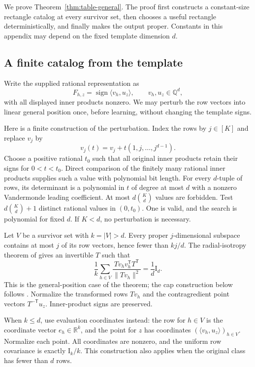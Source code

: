 \documentclass[11pt,letterpaper,pmlr,twoside]{jmlr}
\newcommand{\R}{\mathbb R}
\newcommand{\Q}{\mathbb Q}
\newcommand{\sgn}{\operatorname{sign}}
\newcommand{\ip}[2]{\langle #1,#2\rangle}
\newcommand{\norm}[1]{\lVert #1\rVert}
\newcommand{\Id}{\mathrm I}
\begin{document}
We prove Theorem~\ref{thm:table-general}. The proof first constructs a constant-size rectangle catalog at every survivor set, then chooses a useful rectangle deterministically, and finally makes the output proper. Constants in this appendix may depend on the fixed template dimension $d$.

\subsection{A finite catalog from the template}
Write the supplied rational representation as
\[
 F_{h,z}=\sgn\ip{v_h}{u_z},\qquad v_h,u_z\in\Q^d,
\]
with all displayed inner products nonzero. We may perturb the row vectors into linear general position once, before learning, without changing the template signs.

Here is a finite construction of the perturbation. Index the rows by $j\in[K]$ and replace $v_j$ by
\[
 v_j(t)=v_j+t(1,j,\ldots,j^{d-1}).
\]
Choose a positive rational $t_0$ such that all original inner products retain their signs for $0<t<t_0$. Direct comparison of the finitely many rational inner products supplies such a value with polynomial bit length. For every $d$-tuple of rows, its determinant is a polynomial in $t$ of degree at most $d$ with a nonzero Vandermonde leading coefficient. At most $d\binom Kd$ values are forbidden. Test $d\binom Kd+1$ distinct rational values in $(0,t_0)$. One is valid, and the search is polynomial for fixed $d$. If $K<d$, no perturbation is necessary.

Let $V$ be a survivor set with $k=|V|>d$. Every proper $j$-dimensional subspace contains at most $j$ of its row vectors, hence fewer than $kj/d$. The radial-isotropy theorem of \citet{Forster02} gives an invertible $T$ such that
\begin{equation}
 \frac1k\sum_{h\in V}\frac{Tv_hv_h^{\mathsf T}T^{\mathsf T}}{\norm{Tv_h}^2}
 =\frac1d\Id_d.
\label{eq:radial}
\end{equation}
This is the general-position case of the theorem; the cap construction below follows \citet[Proposition 2.6]{HHPTZ22}. Normalize the transformed rows $Tv_h$ and the contragredient point vectors $T^{-\mathsf T}u_z$. Inner-product signs are preserved.

When $k\le d$, use evaluation coordinates instead: the row for $h\in V$ is the coordinate vector $e_h\in\R^k$, and the point for $z$ has coordinates $(\ip{v_h}{u_z})_{h\in V}$. Normalize each point. All coordinates are nonzero, and the uniform row covariance is exactly $\Id_k/k$. This construction also applies when the original class has fewer than $d$ rows.
\end{document}
